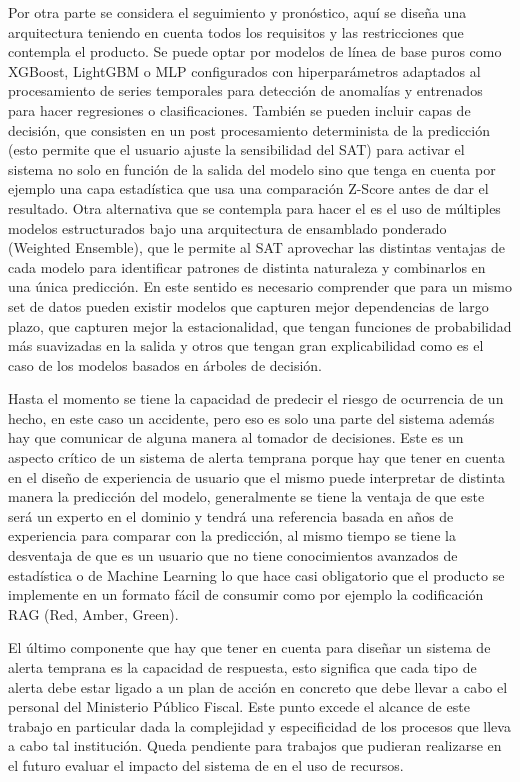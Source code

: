 Por otra parte se considera el seguimiento y pronóstico, aquí se diseña una arquitectura teniendo en cuenta todos los requisitos y las restricciones que contempla el producto. Se puede optar por modelos de línea de base puros como XGBoost, LightGBM o MLP configurados con hiperparámetros adaptados al procesamiento de series temporales para detección de anomalías y entrenados para hacer regresiones o clasificaciones. También se pueden incluir capas de decisión, que consisten en un post procesamiento determinista de la predicción (esto permite que el usuario ajuste la sensibilidad del SAT) para activar el sistema no solo en función de la salida del modelo sino que tenga en cuenta por ejemplo una capa estadística que usa una comparación Z-Score antes de dar el resultado. Otra alternativa que se contempla para hacer el  es el uso de múltiples modelos estructurados bajo una arquitectura de ensamblado ponderado (Weighted Ensemble), que le permite al SAT aprovechar las distintas ventajas de cada modelo para identificar patrones de distinta naturaleza y combinarlos en una única predicción. En este sentido es necesario comprender que para un mismo set de datos pueden existir modelos que capturen mejor dependencias de largo plazo, que capturen mejor la estacionalidad, que tengan funciones de probabilidad más suavizadas en la salida y otros que tengan gran explicabilidad como es el caso de los modelos basados en árboles de decisión.

Hasta el momento se tiene la capacidad de predecir el riesgo de ocurrencia de un hecho, en este caso un accidente, pero eso es solo una parte del sistema además hay que comunicar de alguna manera al tomador de decisiones. Este es un aspecto crítico de un sistema de alerta temprana porque hay que tener en cuenta en el diseño de experiencia de usuario que el mismo puede interpretar de distinta manera la predicción del modelo, generalmente se tiene la ventaja de que este será un experto en el dominio y tendrá una referencia basada en años de experiencia para comparar con la predicción, al mismo tiempo se tiene la desventaja de que es un usuario que no tiene conocimientos avanzados de estadística o de Machine Learning lo que hace casi obligatorio que el producto se implemente en un formato fácil de consumir como por ejemplo la codificación RAG (Red, Amber, Green).

El último componente que hay que tener en cuenta para diseñar un sistema de alerta temprana es la capacidad de respuesta, esto significa que cada tipo de alerta debe estar ligado a un plan de acción en concreto que debe llevar a cabo el personal del Ministerio Público Fiscal. Este punto excede el alcance de este trabajo en particular dada la complejidad y especificidad de los procesos que lleva a cabo tal institución. Queda pendiente para trabajos que pudieran realizarse en el futuro evaluar el impacto del sistema de  en el uso de recursos.

